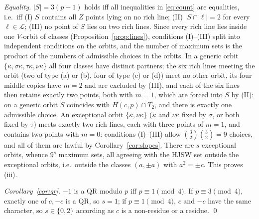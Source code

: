 \documentclass[11pt]{article}
\theoremstyle{remark}
\newcommand{\Hc}{H(c,p)}
\newcommand{\Lc}{\mathcal{L}}
\begin{document}
\smallskip\noindent\emph{Equality.}  $|S|=3(p-1)$ holds iff all inequalities in \eqref{eq:count} are equalities, i.e.\ iff
(I) $S$ contains all $Z$ points lying on no rich line; (II) $|S\cap\ell|=2$ for every $\ell\in\Lc$; (III) no point of $S$
lies on two rich lines.  Since every rich line lies inside one $V$-orbit of classes (Proposition~\ref{prop:lines}),
conditions (I)--(III) split into independent conditions on the orbits, and the number of maximum sets is the product of
the numbers of admissible choices in the orbits.  In a generic orbit $\{\kappa,\sigma\kappa,\tau\kappa,\nu\kappa\}$ all four
classes have distinct partners; the six rich lines meeting the orbit (two of type (a) or (b), four of type (c) or (d))
meet no other orbit, its four middle copies have $m=2$ and are excluded by (III), and each of the six lines then retains
exactly two points, both with $m=1$, which are forced into $S$ by (II): on a generic orbit $S$ coincides with
$\Hc\cap T_2$, and there is exactly one admissible choice.  An exceptional orbit $\{\kappa,\nu\kappa\}$ ($\kappa$ and
$\nu\kappa$ fixed by $\sigma$, or both fixed by $\tau$) meets exactly two rich lines, each with three points of $m=1$,
and contains two points with $m=0$: conditions (I)--(III) allow $\binom32\binom32=9$ choices, and all of them are lawful
by Corollary~\ref{cor:slopes}.  There are $s$ exceptional orbits, whence $9^{s}$ maximum sets, all agreeing with the
HJSW set outside the exceptional orbits, i.e.\ outside the classes $(a,\pm a)$ with $a^2=\pm c$.  This proves (iii).

\smallskip\noindent\emph{Corollary~\ref{cor:qr}.}  $-1$ is a QR modulo $p$ iff $p\equiv1\pmod4$.  If $p\equiv3\pmod4$,
exactly one of $c,-c$ is a QR, so $s=1$; if $p\equiv1\pmod4$, $c$ and $-c$ have the same character, so $s\in\{0,2\}$
according as $c$ is a non-residue or a residue.  \qed
\end{document}

